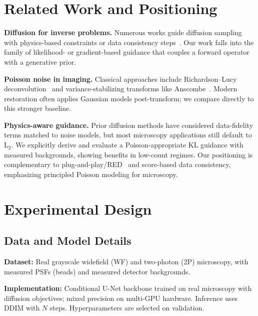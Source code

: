 \documentclass{article}
\newcommand{\wf}{WF\xspace}
\newcommand{\twop}{2P\xspace}
\begin{document}
\section{Related Work and Positioning}
\label{sec:related}
\textbf{Diffusion for inverse problems.} Numerous works guide diffusion sampling with physics-based constraints or data consistency steps~\cite{song2022solving, chung2022diffusion, kawar2022denoising, saharia2022image, rombach2022high}. Our work falls into the family of likelihood- or gradient-based guidance that couples a forward operator with a generative prior.

\textbf{Poisson noise in imaging.} Classical approaches include Richardson--Lucy deconvolution~\cite{richardson1972bayesian, lucy1974iterative} and variance-stabilizing transforms like Anscombe~\cite{anscombe1948}. Modern restoration often applies Gaussian models post-transform; we compare directly to this stronger baseline.

\textbf{Physics-aware guidance.} Prior diffusion methods have considered data-fidelity terms matched to noise models, but most microscopy applications still default to L$_2$. We explicitly derive and evaluate a Poisson-appropriate KL guidance with measured backgrounds, showing benefits in low-count regimes. Our positioning is complementary to plug-and-play/RED~\cite{venkatakrishnan2013plug, romano2017red} and score-based data consistency, emphasizing principled Poisson modeling for microscopy.

\section{Experimental Design}
\label{sec:experiments}
\subsection{Data and Model Details}
\textbf{Dataset:} Real grayscale widefield (\wf) and two-photon (\twop) microscopy, with measured PSFs (beads) and measured detector backgrounds.

\textbf{Implementation:} Conditional U-Net backbone trained on real microscopy with diffusion objectives; mixed precision on multi-GPU hardware. Inference uses DDIM with $N$ steps. Hyperparameters are selected on validation.
\end{document}
